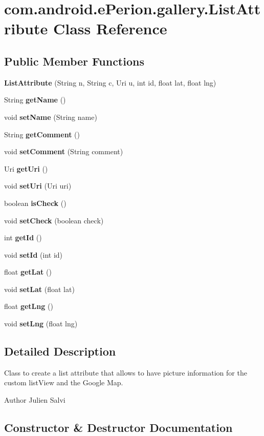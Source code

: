 \section{com.\-android.\-e\-Perion.\-gallery.\-List\-Attribute Class Reference}
\label{classcom_1_1android_1_1e_perion_1_1gallery_1_1_list_attribute}
\subsection*{Public Member Functions}
\begin{DoxyCompactItemize}
\item 
{\bf List\-Attribute} (String n, String c, Uri u, int id, float lat, float lng)
\item 
String {\bf get\-Name} ()
\item 
void {\bf set\-Name} (String name)
\item 
String {\bf get\-Comment} ()
\item 
void {\bf set\-Comment} (String comment)
\item 
Uri {\bf get\-Uri} ()
\item 
void {\bf set\-Uri} (Uri uri)
\item 
boolean {\bf is\-Check} ()
\item 
void {\bf set\-Check} (boolean check)
\item 
int {\bf get\-Id} ()
\item 
void {\bf set\-Id} (int id)
\item 
float {\bf get\-Lat} ()
\item 
void {\bf set\-Lat} (float lat)
\item 
float {\bf get\-Lng} ()
\item 
void {\bf set\-Lng} (float lng)
\end{DoxyCompactItemize}


\subsection{Detailed Description}
Class to create a list attribute that allows to have picture information for the custom list\-View and the Google Map. \begin{DoxyAuthor}{Author}
Julien Salvi 
\end{DoxyAuthor}


\subsection{Constructor \& Destructor Documentation}
